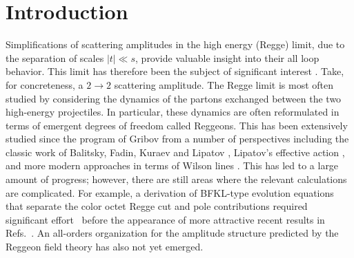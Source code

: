 \documentclass[letterpaper,11pt]{article}
\newcommand{\setmainskip}{\setlength\baselineskip{18pt}}
\begin{document}
\maketitle




\section{Introduction}
\label{sec:intro}

Simplifications of scattering amplitudes in the high energy (Regge) limit, due to the separation of scales $|t| \ll s$, provide valuable insight into their all loop behavior. This limit has therefore been the subject of significant interest \cite{Gell-Mann:1964aya,Mandelstam:1965zz,McCoy:1976ff,Grisaru:1974cf,Grisaru:1973ku,Grisaru:1973vw,Fadin:1975cb,Kuraev:1976ge,Lipatov:1976zz,Kuraev:1977fs,Balitsky:1978ic,Lipatov:1985uk,Lipatov:1995pn}. Take, for concreteness, a $2\to 2$ scattering amplitude. The Regge limit is most often studied by considering the dynamics of the partons exchanged between the two high-energy projectiles. In particular, these dynamics are often reformulated in terms of emergent degrees of freedom called Reggeons. This has been extensively studied since the program of Gribov \cite{Gribov:1968fc,Abarbanel:1975me,Baker:1976cv} from a number of perspectives including the classic work of Balitsky, Fadin, Kuraev and Lipatov \cite{Fadin:1975cb,Lipatov:1976zz,Kuraev:1976ge,Kuraev:1977fs,Balitsky:1978ic,Lipatov:1985uk}, Lipatov's effective action \cite{Lipatov:1995pn}, and more modern approaches in terms of Wilson lines \cite{Balitsky:1995ub,Balitsky:2001gj,Caron-Huot:2013fea,Caron-Huot:2017fxr,Caron-Huot:2017zfo}. 
This has led to a large amount of progress; however, there are still areas where the relevant calculations are complicated. 
For example, a derivation of BFKL-type evolution equations that separate the color octet Regge cut and pole contributions required significant effort~\cite{Fadin:2016wso,Fadin:2017nka,Caron-Huot:2017fxr,Fadin:2019tdt,Fadin:2019qfo,Fadin:2019lnb} before the appearance of more attractive recent results in Refs.~\cite{Caola:2021izf,Falcioni:2021dgr}. An all-orders organization for the amplitude structure predicted by the Reggeon field theory has also not yet emerged.
\end{document}
